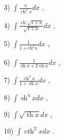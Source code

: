 3) $\int \frac{x}{{\operatorname{ch}}^{2}x}{dx}$ ,

4) $\int \frac{\operatorname{ch}\sqrt{1 + x}}{\sqrt{1 + x}}{dx}$ ,

5) $\int \frac{1}{1 + {\mathrm{{ch}}}^{2}x}{dx}$ ,

6) $\int \frac{1}{\operatorname{sh}x + 2\operatorname{ch}x}{dx}$ ,

7) $\int \frac{{\operatorname{ch}}^{3}x}{1 + \operatorname{sh}x}{dx}$ ,

8) $\int {\operatorname{sh}}^{4}{xdx}$ ,

9) $\int \sqrt{\operatorname{th}x}{dx}$ ,

10) $\int {\operatorname{cth}}^{2}{xdx}$ .

